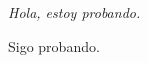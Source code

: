 \documentclass{article}
\begin{document}
\emph{Hola, estoy probando.}

Sigo probando.  
\end{document}
